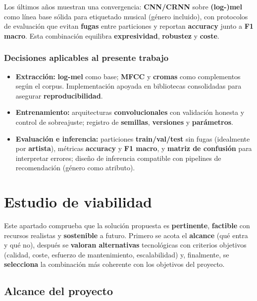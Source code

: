 \documentclass[12pt,twoside]{article}
\begin{document}
Los últimos años muestran una convergencia: \textbf{CNN/CRNN} sobre \textbf{(log-)mel} como línea base sólida para etiquetado musical (género incluido), con protocolos de evaluación que evitan \textbf{fugas} entre particiones y reportan \textbf{accuracy} junto a \textbf{F1 macro}. Esta combinación equilibra \textbf{expresividad}, \textbf{robustez} y \textbf{coste}.

\subsubsection{Decisiones aplicables al presente trabajo}

\begin{itemize}
  \item \textbf{Extracción:} \textbf{log-mel} como base; \textbf{MFCC} y \textbf{cromas} como complementos según el corpus. Implementación apoyada en bibliotecas consolidadas para asegurar \textbf{reproducibilidad}.
  \item \textbf{Entrenamiento:} arquitecturas \textbf{convolucionales} con validación honesta y control de sobreajuste; registro de \textbf{semillas}, \textbf{versiones} y \textbf{parámetros}.
  \item \textbf{Evaluación e inferencia:} particiones \textbf{train/val/test} sin fugas (idealmente por \textbf{artista}), métricas \textbf{accuracy} y \textbf{F1 macro}, y \textbf{matriz de confusión} para interpretar errores; diseño de inferencia compatible con pipelines de recomendación (género como atributo).
\end{itemize}


\section{Estudio de viabilidad}\label{sec:viabilidad}

Este apartado comprueba que la solución propuesta es \textbf{pertinente}, \textbf{factible} con recursos realistas y \textbf{sostenible} a futuro. Primero se acota el \textbf{alcance} (qué entra y qué no), después se \textbf{valoran alternativas} tecnológicas con criterios objetivos (calidad, coste, esfuerzo de mantenimiento, escalabilidad) y, finalmente, se \textbf{selecciona} la combinación más coherente con los objetivos del proyecto.

\subsection{Alcance del proyecto}\label{subsec:viabilidad-alcance}
\end{document}
